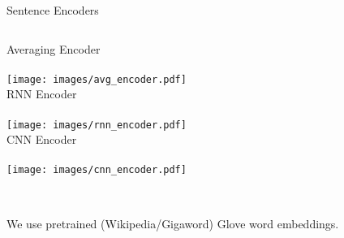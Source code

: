 \begin{frame}{Sentence Encoders}
 \begin{columns}[t]
   \centering
   Averaging Encoder\\~\\
   \texttt{[image: images/avg\_encoder.pdf]}\\
   \centering
   RNN Encoder\\~\\
   \texttt{[image: images/rnn\_encoder.pdf]}\\
   \centering
   CNN Encoder\\~\\
   \texttt{[image: images/cnn\_encoder.pdf]}\\
 \end{columns}

~\\
We use pretrained (Wikipedia/Gigaword) Glove word embeddings.

\end{frame}
%


